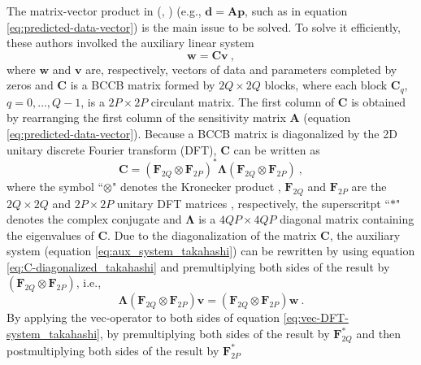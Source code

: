 The matrix-vector product in \citeauthor{takahashi2020} (\citeyear{takahashi2020}, \citeyear{takahashi2022}) 
(e.g.,  $\mathbf{d} = \mathbf{A} \mathbf{p}$, such as in equation \ref{eq:predicted-data-vector})
is the main issue to be solved.
To solve it efficiently, these authors involked the auxiliary linear system
\begin{equation}
\mathbf{w} = \mathbf{C} \mathbf{v} \: ,
\label{eq:aux_system_takahashi}
\end{equation}
where $\mathbf{w}$ and $\mathbf{v}$ are, respectively, vectors of data and parameters completed 
by zeros and $\mathbf{C}$ is a BCCB matrix formed by $2Q \times 2Q$ blocks, where each block 
$\mathbf{C}_{q}$, $q = 0, \dots, Q-1$, is a $2P \times 2P$ circulant matrix. 
The first column of $\mathbf{C}$ is obtained by rearranging the first column of
the sensitivity matrix $\mathbf{A}$ (equation \ref{eq:predicted-data-vector}).
Because a BCCB matrix is diagonalized by the 2D unitary discrete Fourier transform (DFT), 
$\mathbf{C}$ can be written as
\begin{equation}
\mathbf{C} = 
\left(\mathbf{F}_{2Q} \otimes \mathbf{F}_{2P} \right)^{\ast} 
\boldsymbol{\Lambda}
\left(\mathbf{F}_{2Q} \otimes \mathbf{F}_{2P} \right) \: ,
\label{eq:C-diagonalized_takahashi}
\end{equation}
where the symbol ``$\otimes$" denotes the Kronecker product \citep{neudecker1969},
$\mathbf{F}_{2Q}$ and $\mathbf{F}_{2P}$ are the $2Q \times 2Q$ and $2P \times 2P$ 
unitary DFT matrices \citep[][ p. 31]{davis1979}, respectively, the superscritpt 
``$\ast$" denotes the complex conjugate and $\boldsymbol{\Lambda}$ is a 
$4QP \times 4QP$ diagonal matrix containing the eigenvalues of $\mathbf{C}$.
Due to the diagonalization of the matrix $\mathbf{C}$, the auxiliary system 
(equation \ref{eq:aux_system_takahashi}) can be rewritten by using equation 
\ref{eq:C-diagonalized_takahashi} and premultiplying both sides of the result 
by $\left(\mathbf{F}_{2Q} \otimes \mathbf{F}_{2P} \right)$, i.e.,
\begin{equation}
\boldsymbol{\Lambda} \left(\mathbf{F}_{2Q} \otimes \mathbf{F}_{2P} \right) 
\mathbf{v} = \left(\mathbf{F}_{2Q} \otimes \mathbf{F}_{2P} \right) 
\mathbf{w} \: .
\label{eq:vec-DFT-system_takahashi}
\end{equation}
By applying the vec-operator \citep{takahashi2020} to both sides of 
equation \ref{eq:vec-DFT-system_takahashi}, by premultiplying  both sides of 
the result by $\mathbf{F}_{2Q}^{\ast}$ and then postmultiplying both sides of the result by 
$\mathbf{F}_{2P}^{\ast}$
